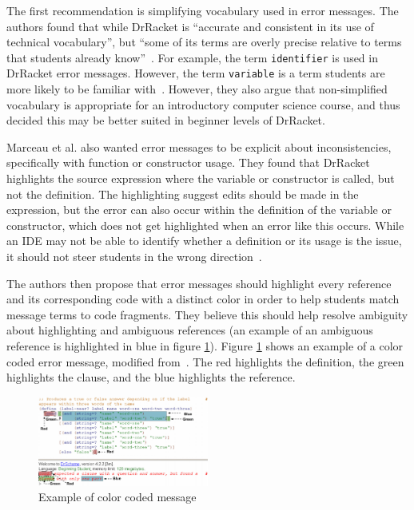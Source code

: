 \documentclass{sig-alternate}
\begin{document}
The first recommendation is simplifying vocabulary used in error messages.
The authors found that while DrRacket is ``accurate and consistent in its use of technical vocabulary'', but ``some of its terms are overly precise relative to terms that students already know''~\cite{Marceau:2011:MYL:2048237.2048241}.
For example, the term \texttt{identifier} is used in DrRacket error messages. However, the term \texttt{variable} is a term students are more likely to be familiar with~\cite{Marceau:2011:MYL:2048237.2048241}.
However, they also argue that non-simplified vocabulary is appropriate for an introductory computer science course, and thus decided this may be better suited in beginner levels of DrRacket.

Marceau et al. also wanted error messages to be explicit about inconsistencies, specifically with function or constructor usage.
They found that DrRacket highlights the source expression where the variable or constructor is called, but not the definition.
The highlighting suggest edits should be made in the expression, but the error can also occur within the definition of the variable or constructor, which does not get highlighted when an error like this occurs.
While an IDE may not be able to identify whether a definition or its usage is the issue, it should not steer students in the wrong direction~\cite{Marceau:2011:MYL:2048237.2048241}.

The authors then propose that error messages should highlight every reference and its corresponding code with a distinct color in order to help students match message terms to code fragments.
They believe this should help resolve ambiguity about highlighting and ambiguous references (an example of an ambiguous reference is highlighted in blue in figure \ref{fig:colorcodedmessage}).
Figure \ref{fig:colorcodedmessage} shows an example of a color coded error message, modified from~\cite{Marceau:2011:MYL:2048237.2048241}.
The red highlights the definition, the green highlights the clause, and the blue highlights the reference.

\begin{figure}
  \centering
  \includegraphics[keepaspectratio, width=0.50\textwidth]{ColorCodedMessage.pdf}
  \caption{Example of color coded message}
  \label{fig:colorcodedmessage}
\end{figure}
\end{document}
